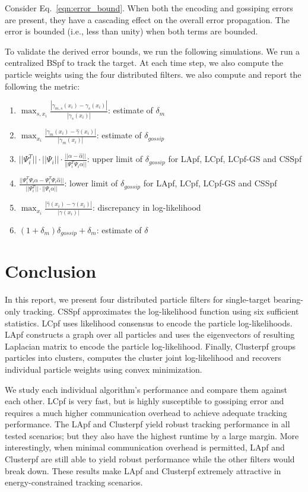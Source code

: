 \documentclass[10pt,letterpaper,final]{article}
\begin{document}
Consider Eq.~\eqref{eqn:error_bound}. When both the encoding and gossiping errors are present, they have a cascading effect on the overall error propagation. The error is bounded (i.e., less than unity) when both terms are bounded. 

To validate the derived error bounds, we run the following simulations. We run a centralized BSpf to track the target. At each time step, we also compute the particle weights using the four distributed filters. we also compute and report the following the metric:
\begin{enumerate}
\item $\max_{s,x_i} \frac{|\gamma_{m,s}(x_i)-\gamma_s(x_i)|}{|\gamma_s(x_i)|}$: estimate of $\delta_m$
\item $\max_{x_i} \frac{|\gamma_m(x_i)-\hat{\gamma}(x_i)|}{|\gamma_m(x_i)|}$: estimate of $\delta_{gossip}$ 
\item $||\Psi_i^T|| \cdot ||\Psi_i||\cdot \frac{||\alpha-\hat{\alpha}||}{||\Psi_i^T\Psi_i\alpha||}$: upper limit of $\delta_{gossip}$ for LApf, LCpf, LCpf-GS and CSSpf
\item $\frac{||\Psi_i^T\Psi_i\alpha-\Psi_i^T\Psi_i\hat{\alpha}||}{||\Psi_i^T||\cdot ||\Psi_i\alpha||}$: lower limit of $\delta_{gossip}$ for LApf, LCpf, LCpf-GS and CSSpf
\item $\max_{x_i} \frac{|\hat{\gamma}(x_i) - \gamma(x_i)|}{|\gamma(x_i)|}$: discrepancy in log-likelihood
\item $(1+\delta_m)\delta_{gossip} + \delta_m$: estimate of $\delta$
\end{enumerate}


\section{Conclusion}
\label{sec:conclusion}
In this report, we present four distributed particle filters for single-target bearing-only tracking. CSSpf approximates the log-likelihood function using six sufficient statistics. LCpf uses likelihood consensus to encode the particle log-likelihoods. LApf constructs a graph over all particles and uses the eigenvectors of resulting Laplacian matrix to encode the particle log-likelihood. Finally, Clusterpf groups particles into clusters, computes the cluster joint log-likelihood and recovers individual particle weights using convex minimization. 

We study each individual algorithm's performance and compare them against each other. LCpf is very fast, but is highly susceptible to gossiping error and requires a much higher communication overhead to achieve adequate tracking performance. The LApf and Clusterpf yield robust tracking performance in all tested scenarios; but they also have the highest runtime by a large margin. More interestingly, when minimal communication overhead is permitted, LApf and Clusterpf are still able to yield robust performance while the other filters would break down. These results make LApf and Clusterpf extremely attractive in energy-constrained tracking scenarios. 



\end{document}
